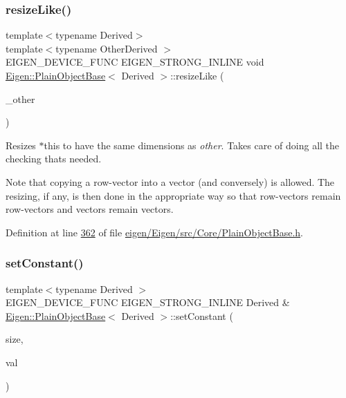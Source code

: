 \subsubsection{\texorpdfstring{resize\+Like()}{resizeLike()}\hspace{0.1cm}{\footnotesize\ttfamily [2/2]}}
{\footnotesize\ttfamily template$<$typename Derived$>$ \\
template$<$typename Other\+Derived $>$ \\
E\+I\+G\+E\+N\+\_\+\+D\+E\+V\+I\+C\+E\+\_\+\+F\+U\+NC E\+I\+G\+E\+N\+\_\+\+S\+T\+R\+O\+N\+G\+\_\+\+I\+N\+L\+I\+NE void \hyperlink{class_eigen_1_1_plain_object_base}{Eigen\+::\+Plain\+Object\+Base}$<$ Derived $>$\+::resize\+Like (\begin{DoxyParamCaption}\item[{const \hyperlink{group___core___module_struct_eigen_1_1_eigen_base}{Eigen\+Base}$<$ Other\+Derived $>$ \&}]{\+\_\+other }\end{DoxyParamCaption})\hspace{0.3cm}{\ttfamily [inline]}}

Resizes {\ttfamily $\ast$this} to have the same dimensions as {\itshape other}. Takes care of doing all the checking that\textquotesingle{}s needed.

Note that copying a row-\/vector into a vector (and conversely) is allowed. The resizing, if any, is then done in the appropriate way so that row-\/vectors remain row-\/vectors and vectors remain vectors. 

Definition at line \hyperlink{eigen_2_eigen_2src_2_core_2_plain_object_base_8h_source_l00362}{362} of file \hyperlink{eigen_2_eigen_2src_2_core_2_plain_object_base_8h_source}{eigen/\+Eigen/src/\+Core/\+Plain\+Object\+Base.\+h}.

\mbox{\label{class_eigen_1_1_plain_object_base_ac8dea1df3d92b752cc683ff42abf6f9b}} 
\subsubsection{\texorpdfstring{set\+Constant()}{setConstant()}\hspace{0.1cm}{\footnotesize\ttfamily [1/2]}}
{\footnotesize\ttfamily template$<$typename Derived $>$ \\
E\+I\+G\+E\+N\+\_\+\+D\+E\+V\+I\+C\+E\+\_\+\+F\+U\+NC E\+I\+G\+E\+N\+\_\+\+S\+T\+R\+O\+N\+G\+\_\+\+I\+N\+L\+I\+NE Derived \& \hyperlink{class_eigen_1_1_plain_object_base}{Eigen\+::\+Plain\+Object\+Base}$<$ Derived $>$\+::set\+Constant (\begin{DoxyParamCaption}\item[{\hyperlink{namespace_eigen_a62e77e0933482dafde8fe197d9a2cfde}{Index}}]{size,  }\item[{const Scalar \&}]{val }\end{DoxyParamCaption})}

